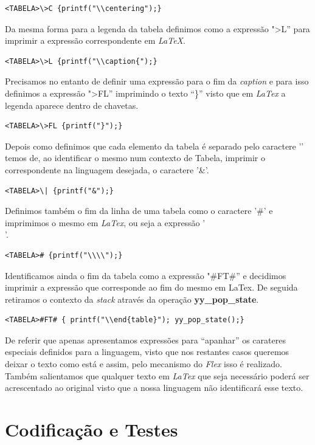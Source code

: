 \documentclass{article}
\begin{document}
\begin{verbatim}
<TABELA>\>C {printf("\\centering");}
\end{verbatim}
Da mesma forma para a legenda da tabela definimos como a expressão "\textgreater L'' para imprimir a expressão correspondente em \textit{LaTeX}.
\begin{verbatim}
<TABELA>\>L {printf("\\caption{");}
\end{verbatim}
Precisamos no entanto de definir uma expressão para o fim da \textit{caption} e para isso definimos a expressão "\textgreater FL''  imprimindo o texto “\}” visto que em \textit{LaTex} a legenda aparece dentro de chavetas.
\begin{verbatim}
<TABELA>\>FL {printf("}");}
\end{verbatim}
Depois como definimos que cada elemento da tabela é separado pelo caractere '\textbar' temos de, ao identificar o mesmo num contexto de Tabela, imprimir o correspondente na linguagem desejada, o caractere '\&'.
\begin{verbatim}
<TABELA>\| {printf("&");}
\end{verbatim}
Definimos também o fim da linha de uma tabela como o caractere '\#' e imprimimos o mesmo em \textit{LaTex}, ou seja a expressão '\\'.
\begin{verbatim}
<TABELA># {printf("\\\\");}
\end{verbatim}
Identificamos ainda o fim da tabela como a expressão "\#FT\#'' e decidimos imprimir a expressão que corresponde ao fim do mesmo em LaTex. De seguida retiramos o contexto da \textit{stack} através da operação \textbf{yy\_pop\_state}.
\begin{verbatim}
<TABELA>#FT# { printf("\\end{table}"); yy_pop_state();}
\end{verbatim}
De referir que apenas apresentamos expressões para “apanhar” os carateres especiais definidos para a linguagem, visto que nos restantes casos queremos deixar o texto como está e assim, pelo mecanismo do \textit{Flex} isso é realizado.
Também salientamos que qualquer texto em \textit{LaTex} que seja necessário poderá ser acrescentado ao original visto que a nossa linguagem não identificará esse texto.



\section{Codificação e Testes} \label{ct}
\end{document}
